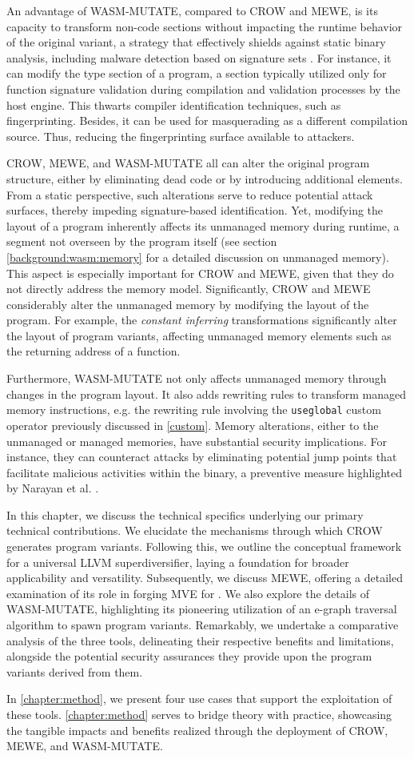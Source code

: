 An advantage of WASM-MUTATE, compared to CROW and MEWE, is its capacity to transform non-code sections without impacting the runtime behavior of the original variant, a strategy that effectively shields against static binary analysis, including malware detection based on signature sets \cite{EVASION}.
For instance, it can modify the type section of a \Wasm program, a section typically utilized only for function signature validation during compilation and validation processes by the host engine. 
This thwarts compiler identification techniques, such as fingerprinting.
Besides, it can be used for masquerading as a different compilation source.
Thus, reducing the fingerprinting surface available to attackers.


CROW, MEWE, and WASM-MUTATE all can alter the original program structure, either by eliminating dead code or by introducing additional elements. 
From a static perspective, such alterations serve to reduce potential attack surfaces, thereby impeding signature-based identification.
Yet, modifying the layout of a \Wasm program inherently affects its unmanaged memory during runtime, a segment not overseen by the \Wasm program itself (see section \autoref{background:wasm:memory} for a detailed discussion on unmanaged memory). 
This aspect is especially important for CROW and MEWE, given that they do not directly address the \Wasm memory model.
Significantly, CROW and MEWE considerably alter the unmanaged memory by modifying the layout of the \Wasm program.
For example, the \emph{constant inferring} transformations significantly alter the layout of program variants, affecting unmanaged memory elements such as the returning address of a function.


Furthermore, WASM-MUTATE not only affects unmanaged memory through changes in the \Wasm program layout.
It also adds rewriting rules to transform managed memory instructions, e.g. the rewriting rule involving the \texttt{useglobal} custom operator previously discussed in \autoref{custom}.
Memory alterations, either to the unmanaged or managed memories, have substantial security implications. 
For instance, they can counteract attacks by eliminating potential jump points that facilitate malicious activities within the binary, a preventive measure highlighted by Narayan et al. \cite{Swivel}.


In this chapter, we discuss the technical specifics underlying our primary technical contributions.
We elucidate the mechanisms through which CROW generates program variants.
Following this, we outline the conceptual framework for a universal LLVM superdiversifier, laying a foundation for broader applicability and versatility.
Subsequently, we discuss MEWE, offering a detailed examination of its role in forging MVE for \Wasm. 
We also explore the details of WASM-MUTATE, highlighting its pioneering utilization of an e-graph traversal algorithm to spawn \wasm program variants. 
Remarkably, we undertake a comparative analysis of the three tools, delineating their respective benefits and limitations, alongside the potential security assurances they provide upon the program variants derived from them. 

In \autoref{chapter:method}, we present four use cases that support the exploitation of these tools.
\autoref{chapter:method} serves to bridge theory with practice, showcasing the tangible impacts and benefits realized through the deployment of CROW, MEWE, and WASM-MUTATE.
